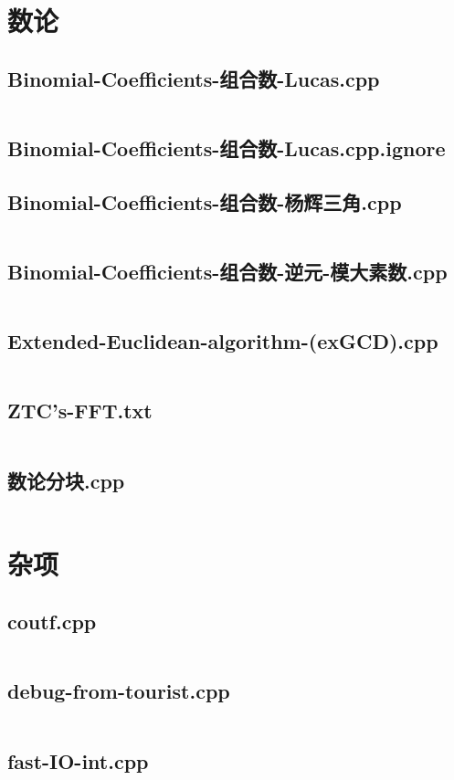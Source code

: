 \documentclass[a4paper,landscape,twocolumn]{book} %
\begin{document}
\chapter{数论}
\section{Binomial-Coefficients-组合数-Lucas.cpp}
\inputminted{c++}{./codes/029}
\section{Binomial-Coefficients-组合数-Lucas.cpp.ignore}
\section{Binomial-Coefficients-组合数-杨辉三角.cpp}
\inputminted{c++}{./codes/031}
\section{Binomial-Coefficients-组合数-逆元-模大素数.cpp}
\inputminted{c++}{./codes/032}
\section{Extended-Euclidean-algorithm-(exGCD).cpp}
\inputminted{c++}{./codes/033}
\section{ZTC's-FFT.txt}
\inputminted{text}{./codes/034}
\section{数论分块.cpp}
\inputminted{c++}{./codes/035}
\chapter{杂项}
\section{coutf.cpp}
\inputminted{c++}{./codes/036}
\section{debug-from-tourist.cpp}
\inputminted{c++}{./codes/037}
\section{fast-IO-int.cpp}
\inputminted{c++}{./codes/038}
\end{document}
